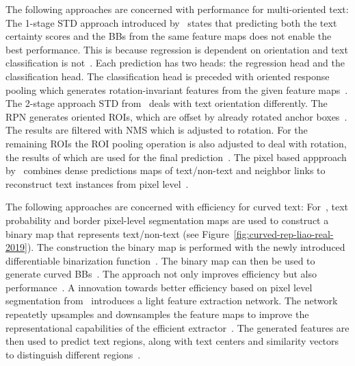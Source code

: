 The following approaches are concerned with performance for multi-oriented text:
The 1-stage \ac{STD} approach introduced by~\cite{liao_rotation-sensitive_2018} states that
predicting both the text certainty scores and the \acp{BB} from the same feature maps does not
enable the best performance.
This is because regression is dependent on orientation and text classification is
not~\citep{liao_rotation-sensitive_2018}.
Each prediction has two heads: the regression head and the classification head.
The classification head is preceded with oriented response pooling which generates rotation-invariant
features from the given feature maps~\citep{liao_rotation-sensitive_2018}.
The 2-stage approach \ac{STD} from~\cite{ma_arbitrary-oriented_2018} deals with text orientation
differently.
The \ac{RPN} generates oriented \acp{ROI}, which are offset by already rotated anchor
boxes~\citep{ma_arbitrary-oriented_2018}.
The results are filtered with \ac{NMS} which is adjusted to rotation.
For the remaining \acp{ROI} the \ac{ROI} pooling operation is also adjusted to deal with rotation,
the results of which are used for the final prediction~\citep{ma_arbitrary-oriented_2018}.
The pixel based appproach by~\cite{deng_pixellink_2018} combines dense predictions maps of
text/non-text and neighbor links to reconstruct text instances
from pixel level~\citep{deng_pixellink_2018}.

The following approaches are concerned with efficiency for curved text:
For~\cite{liao_real-time_2019}, text probability and border pixel-level segmentation maps are used
to construct a binary map that represents text/non-text (see
Figure~\ref{fig:curved-rep-liao-real-2019}).
The construction the binary map is performed with the newly introduced differentiable binarization
function~\citep{liao_real-time_2019}.
The binary map can then be used to generate curved \acp{BB}~\citep{liao_real-time_2019}.
The approach not only improves efficiency but also performance~\citep{liao_real-time_2019}.
A innovation towards better efficiency based on pixel level segmentation
from~\cite{wang_efficient_2019} introduces a light feature extraction network.
The network repeatetly upsamples and downsamples the feature maps to improve the representational
capabilities of the efficient extractor~\citep{wang_efficient_2019}.
The generated features are then used to predict text regions, along with text centers and similarity
vectors to distinguish different regions~\citep{wang_efficient_2019}.

